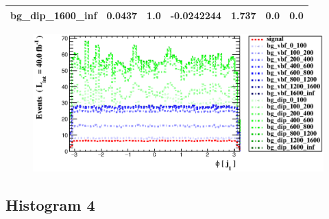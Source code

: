 \documentclass[a4paper, 10pt]{article}
\begin{document}
\begin{table}[H]
\begin{center}
\begin{tabular}{|m{23.0mm}|m{23.0mm}|m{18.0mm}|m{19.0mm}|m{19.0mm}|m{19.0mm}|m{19.0mm}|}
      \hline
      {\cellcolor{white}         bg\_dip\_1600\_inf}& {\cellcolor{white}         0.0437}& {\cellcolor{white}         1.0}& {\cellcolor{white}         -0.0242244}& {\cellcolor{white}         1.737}& {\cellcolor{green}         0.0}& {\cellcolor{green}         0.0}\\
\hline
    \end{tabular}
  \end{center}
\end{table}

\begin{figure}[H]
  \begin{center}
    \includegraphics[scale=0.45]{selection_2.eps}\\
\caption{   }
  \end{center}
\end{figure}
      \newpage
\subsection{ Histogram 4}
\end{document}
